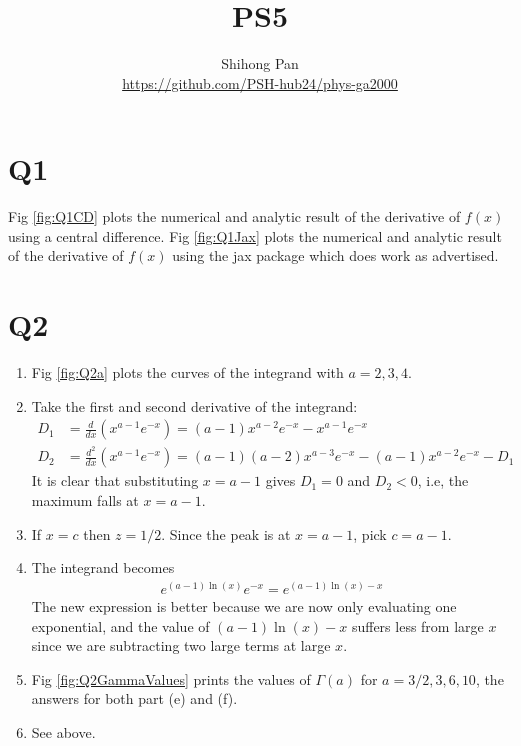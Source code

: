\documentclass[11pt]{article}
\title{PS5}
\author{Shihong Pan\\ \url{https://github.com/PSH-hub24/phys-ga2000}}
\begin{document}
\maketitle

\section{Q1}
Fig \ref{fig:Q1CD} plots the numerical and analytic result of the derivative of $f(x)$ using a central difference. Fig \ref{fig:Q1Jax} plots the numerical and analytic result of the derivative of $f(x)$ using the jax package which does work as advertised. 

\section{Q2}
\begin{enumerate}[label=(\alph*)]
    \item Fig \ref{fig:Q2a} plots the curves of the integrand with $a=2,3,4$.
    \item Take the first and second derivative of the integrand:
    \begin{align}
        D_1 &= \frac{d}{dx}(x^{a-1}e^{-x})=(a-1)x^{a-2}e^{-x}-x^{a-1}e^{-x}\\
        D_2 &= \frac{d^2}{dx}(x^{a-1}e^{-x})=(a-1)(a-2)x^{a-3}e^{-x}-(a-1)x^{a-2}e^{-x}-D_1
    \end{align}
    It is clear that substituting $x=a-1$ gives $D_1=0$ and $D_2<0$, i.e, the maximum falls at $x=a-1$.
    \item If $x=c$ then $z=1/2$. Since the peak is at $x=a-1$, pick $c=a-1$.
    \item The integrand becomes
    \begin{align}
        e^{(a-1)\ln(x)}e^{-x}=e^{(a-1)\ln(x)-x}
    \end{align}
    The new expression is better because we are now only evaluating one exponential, and the value of $(a-1)\ln(x)-x$ suffers less from large $x$ since we are subtracting two large terms at large $x$.
    \item Fig \ref{fig:Q2GammaValues} prints the values of $\Gamma(a)$ for $a=3/2,3,6,10$, the answers for both part (e) and (f).
    \item See above.
\end{enumerate}
\end{document}
